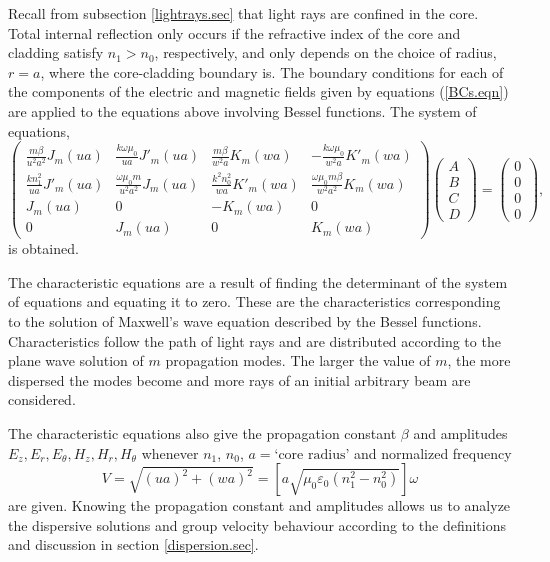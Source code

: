 \documentclass[12pt]{article}
\theoremstyle{definition}
\numberwithin{equation}{section}
\begin{document}
{Recall from subsection \ref{lightrays.sec} that light rays are confined in the core. Total internal reflection only occurs if the refractive index of the core and cladding satisfy $n_1>n_0$, respectively, and only depends on the choice of radius, $r=a$, where the core-cladding boundary is. The boundary conditions for each of the components of the electric and magnetic fields given by equations (\ref{BCs.eqn}) are applied to the equations above involving Bessel functions. The system of equations,
\begin{equation*}
\left(\begin{array}{cccc}
\frac{m\beta}{u^2a^2}J_m(ua)&\frac{k\omega\mu_0}{ua}J'_m(ua)&\frac{m\beta}{w^2a}K_m(wa)&-\frac{k\omega\mu_0}{w^2a}K'_m(wa)\\
\frac{kn_1^2}{ua}J'_m(ua)&\frac{\omega\mu_0m}{u^2a^2}J_m(ua)&\frac{k^2n_0^2}{wa}K'_m(wa)&\frac{\omega\mu_0m\beta}{w^2a^2}K_m(wa)\\
J_m(ua)&0&-K_m(wa)&0\\
0&J_m(ua)&0&K_m(wa)
\end{array}\right)
\left(\begin{array}{c}A\\B\\C\\D\end{array}\right)=
\left(\begin{array}{c}0\\0\\0\\0\end{array}\right),
\end{equation*}
is obtained.

The characteristic equations are a result of finding the determinant of the system of equations and equating it to zero. These are the characteristics corresponding to the solution of Maxwell's wave equation described by the Bessel functions. Characteristics follow the path of light rays and are distributed according to the plane wave solution of $m$ propagation modes. The larger the value of $m$, the more dispersed the modes become and more rays of an initial arbitrary beam are considered. 

The characteristic equations also give the propagation constant $\beta$ and amplitudes $E_z,E_r,E_\theta,H_z,H_r,H_\theta$ whenever $n_1$, $n_0$, $a=\mbox{`core radius'}$ and normalized frequency
$$V=\sqrt{(ua)^2+(wa)^2}=\left[a\sqrt{\mu_0\varepsilon_0(n_1^2-n_0^2)}\right]\omega$$ are given. Knowing the propagation constant and amplitudes allows us to analyze the dispersive solutions and group velocity behaviour according to the definitions and discussion in section \ref{dispersion.sec}.

}
\end{document}
